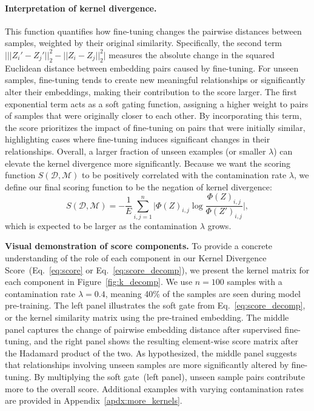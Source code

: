 \paragraph{Interpretation of kernel divergence.} This function quantifies how fine-tuning changes the pairwise distances between samples, weighted by their original similarity. Specifically, the second term $\big\vert||Z_i' - Z_j'||_2^2 - ||Z_i - Z_j||_2^2\big\vert$ measures the absolute change in the squared Euclidean distance between embedding pairs caused by fine-tuning. For unseen samples, fine-tuning tends to create new meaningful relationships or significantly alter their embeddings, making their contribution to the score larger. 
The first exponential term acts as a soft gating function, assigning a higher weight to pairs of samples that were originally closer to each other. By incorporating this term, the score prioritizes the impact of fine-tuning on pairs that were initially similar, highlighting cases where fine-tuning induces significant changes in their relationships. Overall, a larger fraction of unseen examples (or smaller $\lambda$) can elevate the kernel divergence more significantly. Because we want the scoring function $S(\mathcal{D},\mathcal{M})$ to be positively correlated with the contamination rate $\lambda$, we define our final scoring function to be the negation of kernel divergence:
\begin{equation}
\label{eq:final_score}
S(\mathcal{D}, \mathcal{M}) = -  \frac{1}{E} \sum_{i,j=1}^n  \bigg\vert\Phi(Z)_{i,j} \log \frac{\Phi(Z)_{i,j}}{\Phi(Z')_{i,j}} \bigg\vert,
\end{equation}
which is expected to be larger as the contamination $\lambda$ grows.


\noindent\textbf{Visual demonstration of score components.}
To provide a concrete understanding of the role of each component in our Kernel Divergence Score~(Eq.~\eqref{eq:score} or Eq.~\eqref{eq:score_decomp}), we present the kernel matrix for each component in Figure~\ref{fig:k_decomp}. 
We use $n=100$ samples with a contamination rate $\lambda=0.4$, meaning 40\% of the samples are seen during model pre-training. The left panel illustrates the soft gate from Eq.~\eqref{eq:score_decomp}, or the kernel similarity matrix using the pre-trained embedding. The middle panel captures the change of pairwise embedding distance after supervised fine-tuning, and the right panel shows the resulting element-wise score matrix after the Hadamard product of the two.
As hypothesized, the middle panel suggests that relationships involving unseen samples are more significantly altered by fine-tuning. By multiplying the soft gate~(left panel), unseen sample pairs contribute more to the overall score. Additional examples with varying contamination rates are provided in Appendix~\ref{apdx:more_kernels}.